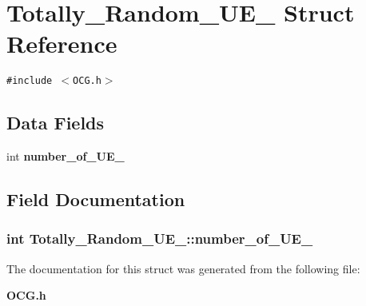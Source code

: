 \section{Totally\_\-Random\_\-UE\_\- Struct Reference}
\label{structTotally__Random__UE__}
{\tt \#include $<$OCG.h$>$}

\subsection*{Data Fields}
\begin{CompactItemize}
\item 
int {\bf number\_\-of\_\-UE\_\-}
\end{CompactItemize}


\subsection{Field Documentation}
\subsubsection[{number\_\-of\_\-UE\_\-}]{\setlength{\rightskip}{0pt plus 5cm}int {\bf Totally\_\-Random\_\-UE\_\-::number\_\-of\_\-UE\_\-}}\label{structTotally__Random__UE___b515d45b973266aabd200de3bc5544af}




The documentation for this struct was generated from the following file:\begin{CompactItemize}
\item 
{\bf OCG.h}\end{CompactItemize}
